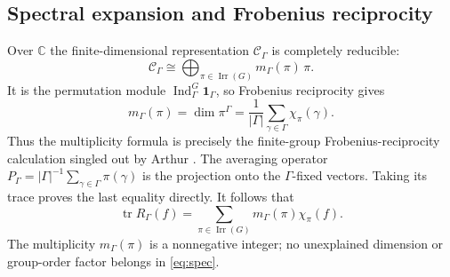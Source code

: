 \documentclass[12pt]{article}
\theoremstyle{remark}
\newcommand{\C}{\mathbb C}
\newcommand{\Ind}{\operatorname{Ind}}
\newcommand{\tr}{\operatorname{tr}}
\newcommand{\id}{\mathbf 1}
\newcommand{\Irr}{\operatorname{Irr}}
\newcommand{\cH}{\mathcal C}
\begin{document}
\subsection{Spectral expansion and Frobenius reciprocity}
Over $\C$ the finite-dimensional representation $\cH_\Gamma$
is completely reducible:
\begin{equation}\label{eq:decomp}
 \cH_\Gamma\cong
 \bigoplus_{\pi\in\Irr(G)}m_\Gamma(\pi)\,\pi.
\end{equation}
It is the permutation module $\Ind_\Gamma^G\id_\Gamma$, so
Frobenius reciprocity gives
\begin{equation}\label{eq:mult}
 \boxed{\displaystyle
 m_\Gamma(\pi)=\dim\pi^\Gamma
  =\frac1{|\Gamma|}\sum_{\gamma\in\Gamma}\chi_\pi(\gamma).}
\end{equation}
Thus the multiplicity formula is precisely the finite-group
Frobenius-reciprocity calculation singled out by Arthur
\cite[p.~14]{ArthurHecke1989}. The averaging operator
$P_\Gamma=|\Gamma|^{-1}\sum_{\gamma\in\Gamma}\pi(\gamma)$
is the projection onto the $\Gamma$-fixed vectors. Taking its trace
proves the last equality directly. It follows that
\begin{equation}\label{eq:spec}
 \tr R_\Gamma(f)
 =\sum_{\pi\in\Irr(G)}m_\Gamma(\pi)\chi_\pi(f).
\end{equation}
The multiplicity $m_\Gamma(\pi)$ is a nonnegative integer;
no unexplained dimension or group-order factor belongs in
\eqref{eq:spec}.
\end{document}
